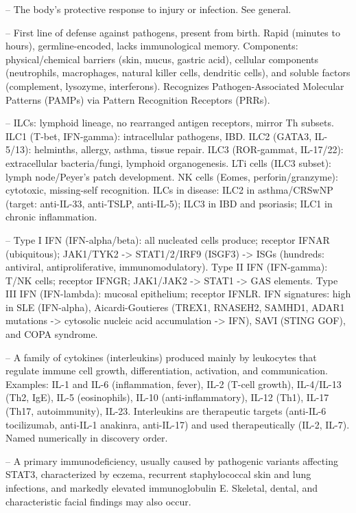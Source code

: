 -- The body's protective response to injury or infection. See general.

-- First line of defense against pathogens, present from birth. Rapid (minutes to hours), germline-encoded, lacks immunological memory. Components: physical/chemical barriers (skin, mucus, gastric acid), cellular components (neutrophils, macrophages, natural killer cells, dendritic cells), and soluble factors (complement, lysozyme, interferons). Recognizes Pathogen-Associated Molecular Patterns (PAMPs) via Pattern Recognition Receptors (PRRs).

-- ILCs: lymphoid lineage, no rearranged antigen receptors, mirror Th subsets. ILC1 (T-bet, IFN-gamma): intracellular pathogens, IBD. ILC2 (GATA3, IL-5/13): helminths, allergy, asthma, tissue repair. ILC3 (ROR-gammat, IL-17/22): extracellular bacteria/fungi, lymphoid organogenesis. LTi cells (ILC3 subset): lymph node/Peyer's patch development. NK cells (Eomes, perforin/granzyme): cytotoxic, missing-self recognition. ILCs in disease: ILC2 in asthma/CRSwNP (target: anti-IL-33, anti-TSLP, anti-IL-5); ILC3 in IBD and psoriasis; ILC1 in chronic inflammation.

-- Type I IFN (IFN-alpha/beta): all nucleated cells produce; receptor IFNAR (ubiquitous); JAK1/TYK2 -> STAT1/2/IRF9 (ISGF3) -> ISGs (hundreds: antiviral, antiproliferative, immunomodulatory). Type II IFN (IFN-gamma): T/NK cells; receptor IFNGR; JAK1/JAK2 -> STAT1 -> GAS elements. Type III IFN (IFN-lambda): mucosal epithelium; receptor IFNLR. IFN signatures: high in SLE (IFN-alpha), Aicardi-Goutieres (TREX1, RNASEH2, SAMHD1, ADAR1 mutations -> cytosolic nucleic acid accumulation -> IFN), SAVI (STING GOF), and COPA syndrome.

-- A family of cytokines (interleukins) produced mainly by leukocytes that regulate immune cell growth, differentiation, activation, and communication. Examples: IL-1 and IL-6 (inflammation, fever), IL-2 (T-cell growth), IL-4/IL-13 (Th2, IgE), IL-5 (eosinophils), IL-10 (anti-inflammatory), IL-12 (Th1), IL-17 (Th17, autoimmunity), IL-23. Interleukins are therapeutic targets (anti-IL-6 tocilizumab, anti-IL-1 anakinra, anti-IL-17) and used therapeutically (IL-2, IL-7). Named numerically in discovery order.

-- A primary immunodeficiency, usually caused by pathogenic variants affecting STAT3, characterized by eczema, recurrent staphylococcal skin and lung infections, and markedly elevated immunoglobulin E. Skeletal, dental, and characteristic facial findings may also occur.

